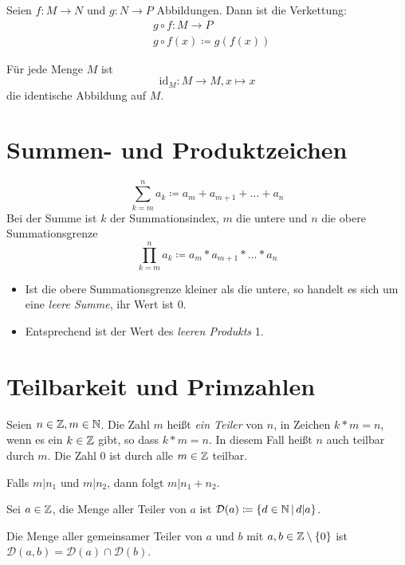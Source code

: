 Seien $f:M\rightarrow N$ und $g:N\rightarrow P$ Abbildungen. Dann ist die Verkettung:
\begin{align*}
  &g\circ f:M\rightarrow P\\
  &g\circ f(x)\coloneqq g(f(x))
\end{align*}

Für jede Menge $M$ ist
\begin{equation*}
  \mathrm{id}_M:M\rightarrow M, x\mapsto x
\end{equation*}
die identische Abbildung auf $M$.

\section{Summen- und Produktzeichen}
\begin{equation*}
  \sum\limits_{k=m}^n a_k\coloneqq a_m + a_{m+1} + \ldots + a_n
\end{equation*}
Bei der Summe ist $k$ der Summationsindex, $m$ die untere und $n$ die obere Summationsgrenze
\begin{equation*}
  \prod\limits_{k=m}^n a_k\coloneqq a_m * a_{m+1} * \ldots * a_n
\end{equation*}

\bemerkung
\begin{itemize}
  \item Ist die obere Summationsgrenze kleiner als die untere, so handelt es sich um eine \emph{leere Summe}, ihr Wert ist 0.
  \item Entsprechend ist der Wert des \emph{leeren Produkts} 1.
\end{itemize}

\section{Teilbarkeit und Primzahlen}
Seien $n\in\mathbb{Z}, m\in\mathbb{N}$. Die Zahl $m$ heißt \emph{ein Teiler} von $n$, in Zeichen $k* m=n$, wenn es ein $k\in\mathbb{Z}$ gibt, so dass $k* m = n$. In diesem Fall heißt $n$ auch teilbar durch $m$.
Die Zahl $0$ ist durch alle $m\in\mathbb{Z}$ teilbar.

Falls $m|n_1$ und $m|n_2$, dann folgt $m|n_1+n_2$.

Sei $a\in\mathbb{Z}$, die Menge aller Teiler von $a$ ist $\mathcal{D}(a)\coloneqq\left\{ d\in\mathbb{N} \,\middle|\, d|a \right\}$.

Die Menge aller gemeinsamer Teiler von $a$ und $b$ mit $a,b\in\mathbb{Z}\setminus\{ 0\}$ ist $\mathcal{D}(a,b) = \mathcal{D}(a) \cap \mathcal{D}(b)$.

